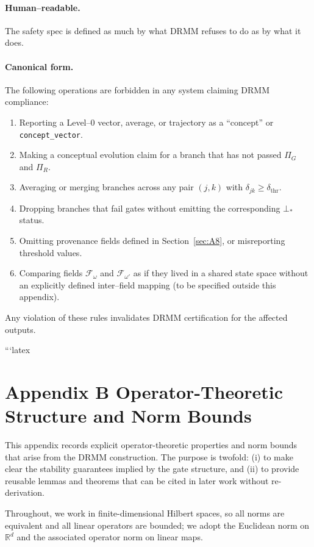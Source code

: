 \documentclass[11pt, a4paper]{article}
\begin{document}
\paragraph{Human–readable.}
The safety spec is defined as much by what DRMM refuses to do as by what it does.

\paragraph{Canonical form.}
The following operations are forbidden in any system claiming DRMM compliance:
\begin{enumerate}[label=(F\arabic*)]
  \item Reporting a Level–0 vector, average, or trajectory as a ``concept'' or \texttt{concept\_vector}.
  \item Making a conceptual evolution claim for a branch that has not passed $\Pi_G$ and $\Pi_R$.
  \item Averaging or merging branches across any pair $(j,k)$ with $\delta_{jk} \ge \delta_{\mathrm{thr}}$.
  \item Dropping branches that fail gates without emitting the corresponding $\bot_\ast$ status.
  \item Omitting provenance fields defined in Section~\ref{sec:A8}, or misreporting threshold values.
  \item Comparing fields $\mathcal{F}_\omega$ and $\mathcal{F}_{\omega'}$ as if they lived in a shared state space without an explicitly defined inter–field mapping (to be specified outside this appendix).
\end{enumerate}

Any violation of these rules invalidates DRMM certification for the affected outputs.


```latex
\appendix

\section*{Appendix B \quad Operator-Theoretic Structure and Norm Bounds}

This appendix records explicit operator-theoretic properties and norm bounds that arise from the DRMM construction.
The purpose is twofold:
(i) to make clear the stability guarantees implied by the gate structure, and
(ii) to provide reusable lemmas and theorems that can be cited in later work without re-derivation.

Throughout, we work in finite-dimensional Hilbert spaces, so all norms are equivalent and all linear operators are bounded; we adopt the Euclidean norm on $\mathbb{R}^d$ and the associated operator norm on linear maps.
\end{document}
